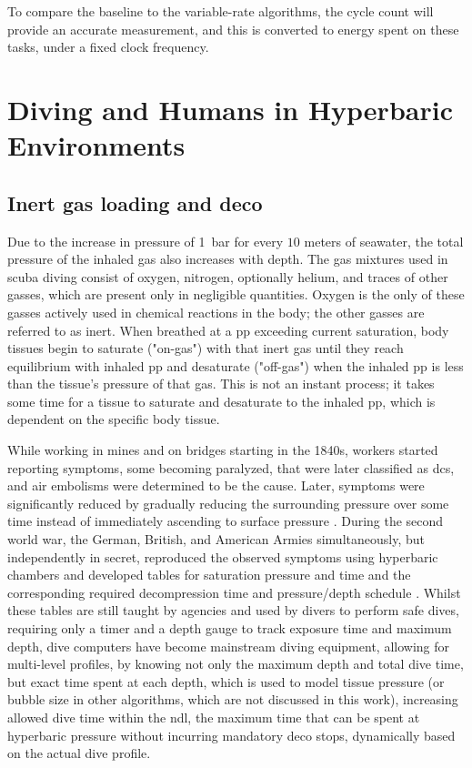 To compare the baseline to the variable-rate algorithms, the cycle count will provide an accurate measurement, and this is converted to energy spent on these tasks, under a fixed clock frequency.

\section{Diving and Humans in Hyperbaric Environments}
\subsection{Inert gas loading and \gls{deco}}
Due to the increase in pressure of \SI{1}{\bar} for every $10$ meters of seawater, the total pressure of the inhaled gas also increases with depth. The gas mixtures used in scuba diving consist of oxygen, nitrogen, optionally helium, and traces of other gasses, which are present only in negligible quantities. Oxygen is the only of these gasses actively used in chemical reactions in the body; the other gasses are referred to as inert. When breathed at a \gls{pp} exceeding current saturation, body tissues begin to saturate ("on-gas") with that inert gas until they reach equilibrium with inhaled \gls{pp} and desaturate ("off-gas") when the inhaled \gls{pp} is less than the tissue's pressure of that gas. This is not an instant process; it takes some time for a tissue to saturate and desaturate to the inhaled \gls{pp}, which is dependent on the specific body tissue.

While working in mines and on bridges starting in the 1840s, workers started reporting symptoms, some becoming paralyzed, that were later classified as \gls{dcs}, and air embolisms were determined to be the cause. Later, symptoms were significantly reduced by gradually reducing the surrounding pressure over some time instead of immediately ascending to surface pressure \cite{prev-dci-1908}. 
During the second world war, the German, British, and American Armies simultaneously, but independently in secret, reproduced the observed symptoms using hyperbaric chambers and developed tables for saturation pressure and time and the corresponding required decompression time and pressure/depth schedule \cite{chamber-divers-2024}. 
Whilst these tables are still taught by agencies and used by divers to perform safe dives, requiring only a timer and a depth gauge to track exposure time and maximum depth, dive computers have become mainstream diving equipment, allowing for multi-level profiles, by knowing not only the maximum depth and total dive time, but exact time spent at each depth, which is used to model tissue pressure (or bubble size in other algorithms, which are not discussed in this work), increasing allowed dive time within the \gls{ndl}, the maximum time that can be spent at hyperbaric pressure without incurring mandatory \gls{deco} stops, dynamically based on the actual dive profile.

